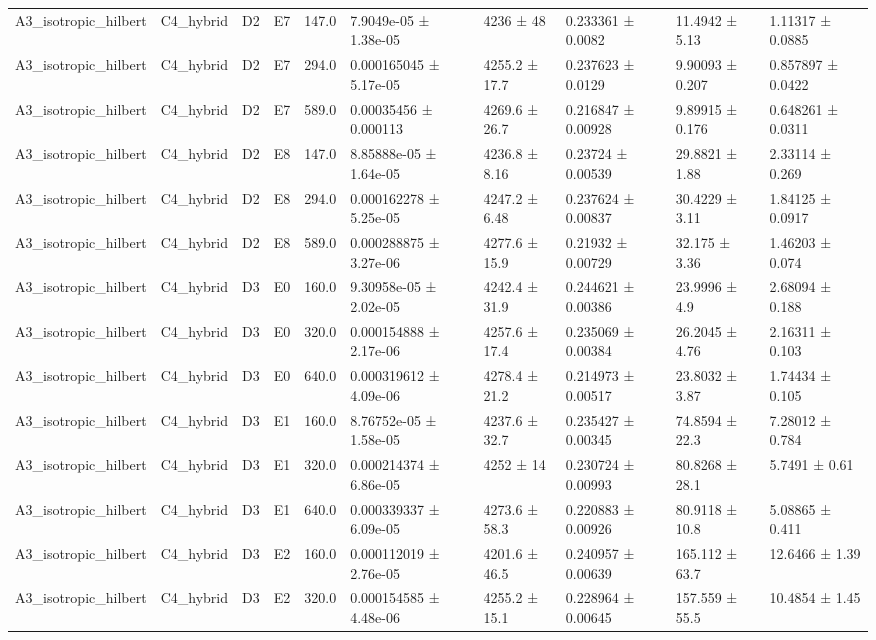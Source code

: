 \begin{table}
\begin{tabular}{llllllllll}
A3\_isotropic\_hilbert & C4\_hybrid & D2 & E7 & 147.0 & 7.9049e-05 ± 1.38e-05 & 4236 ± 48 & 0.233361 ± 0.0082 & 11.4942 ± 5.13 & 1.11317 ± 0.0885 \\
A3\_isotropic\_hilbert & C4\_hybrid & D2 & E7 & 294.0 & 0.000165045 ± 5.17e-05 & 4255.2 ± 17.7 & 0.237623 ± 0.0129 & 9.90093 ± 0.207 & 0.857897 ± 0.0422 \\
A3\_isotropic\_hilbert & C4\_hybrid & D2 & E7 & 589.0 & 0.00035456 ± 0.000113 & 4269.6 ± 26.7 & 0.216847 ± 0.00928 & 9.89915 ± 0.176 & 0.648261 ± 0.0311 \\
A3\_isotropic\_hilbert & C4\_hybrid & D2 & E8 & 147.0 & 8.85888e-05 ± 1.64e-05 & 4236.8 ± 8.16 & 0.23724 ± 0.00539 & 29.8821 ± 1.88 & 2.33114 ± 0.269 \\
A3\_isotropic\_hilbert & C4\_hybrid & D2 & E8 & 294.0 & 0.000162278 ± 5.25e-05 & 4247.2 ± 6.48 & 0.237624 ± 0.00837 & 30.4229 ± 3.11 & 1.84125 ± 0.0917 \\
A3\_isotropic\_hilbert & C4\_hybrid & D2 & E8 & 589.0 & 0.000288875 ± 3.27e-06 & 4277.6 ± 15.9 & 0.21932 ± 0.00729 & 32.175 ± 3.36 & 1.46203 ± 0.074 \\
A3\_isotropic\_hilbert & C4\_hybrid & D3 & E0 & 160.0 & 9.30958e-05 ± 2.02e-05 & 4242.4 ± 31.9 & 0.244621 ± 0.00386 & 23.9996 ± 4.9 & 2.68094 ± 0.188 \\
A3\_isotropic\_hilbert & C4\_hybrid & D3 & E0 & 320.0 & 0.000154888 ± 2.17e-06 & 4257.6 ± 17.4 & 0.235069 ± 0.00384 & 26.2045 ± 4.76 & 2.16311 ± 0.103 \\
A3\_isotropic\_hilbert & C4\_hybrid & D3 & E0 & 640.0 & 0.000319612 ± 4.09e-06 & 4278.4 ± 21.2 & 0.214973 ± 0.00517 & 23.8032 ± 3.87 & 1.74434 ± 0.105 \\
A3\_isotropic\_hilbert & C4\_hybrid & D3 & E1 & 160.0 & 8.76752e-05 ± 1.58e-05 & 4237.6 ± 32.7 & 0.235427 ± 0.00345 & 74.8594 ± 22.3 & 7.28012 ± 0.784 \\
A3\_isotropic\_hilbert & C4\_hybrid & D3 & E1 & 320.0 & 0.000214374 ± 6.86e-05 & 4252 ± 14 & 0.230724 ± 0.00993 & 80.8268 ± 28.1 & 5.7491 ± 0.61 \\
A3\_isotropic\_hilbert & C4\_hybrid & D3 & E1 & 640.0 & 0.000339337 ± 6.09e-05 & 4273.6 ± 58.3 & 0.220883 ± 0.00926 & 80.9118 ± 10.8 & 5.08865 ± 0.411 \\
A3\_isotropic\_hilbert & C4\_hybrid & D3 & E2 & 160.0 & 0.000112019 ± 2.76e-05 & 4201.6 ± 46.5 & 0.240957 ± 0.00639 & 165.112 ± 63.7 & 12.6466 ± 1.39 \\
A3\_isotropic\_hilbert & C4\_hybrid & D3 & E2 & 320.0 & 0.000154585 ± 4.48e-06 & 4255.2 ± 15.1 & 0.228964 ± 0.00645 & 157.559 ± 55.5 & 10.4854 ± 1.45 \\

\end{tabular}
\end{table}
